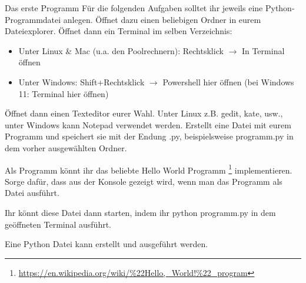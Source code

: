 \begin{task}{Das erste Programm}
    Für die folgenden Aufgaben solltet ihr jeweils eine Python-Programmdatei
    anlegen.
    Öffnet dazu einen beliebigen Ordner in eurem Dateiexplorer.
    Öffnet dann ein Terminal im selben Verzeichnis:

    \begin{itemize}
        \item Unter Linux \& Mac (u.a. den Poolrechnern): Rechtsklick $\to$ In Terminal öffnen
        \item Unter Windows: Shift+Rechtsklick $\to$ Powershell hier öffnen (bei Windows 11: Terminal hier öffnen)
    \end{itemize}

    Öffnet dann einen Texteditor eurer Wahl. Unter Linux z.B.
    {\ttfamily gedit, kate, usw.}, unter Windows kann Notepad verwendet werden.
    Erstellt eine Datei mit eurem Programm und speichert sie mit der Endung
    {\ttfamily.py}, beispielsweise {\ttfamily programm.py}
    in dem vorher ausgewählten Ordner.

    Als Programm könnt ihr das beliebte Hello World Programm
    \footnote{\url{https://en.wikipedia.org/wiki/\%22Hello,_World!\%22_program}}
    implementieren.
    Sorge dafür, dass  aus der Konsole
    gezeigt wird, wenn man das Programm als Datei ausführt.

    Ihr könnt diese Datei dann starten,
    indem ihr {\ttfamily python programm.py} in dem geöffneten Terminal ausführt.

    \begin{solution}
        Eine Python Datei kann erstellt und ausgeführt werden.
    \end{solution}
\end{task}

